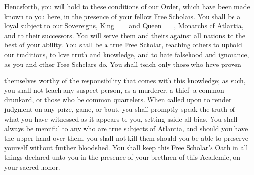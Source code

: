 \documentclass[avery5371,grid]{flashcards}
\begin{document}
\begin{flashcard}{
    \begin{minipage}{\cardinnerwidth}
        \fontsize{10}{10}
        \normalfont
        Henceforth, you will hold to these conditions of our Order, which have been made known to you here, in the presence of your fellow Free Scholars.
        You shall be a loyal subject to our Sovereigns, King \_\_ and Queen \_\_, Monarchs of Atlantia, and to their successors. You will serve them and theirs against all nations to the best of your ability.
        You shall be a true Free Scholar, teaching others to uphold our traditions, to love truth and knowledge, and to hate falsehood and ignorance, as you and other Free Scholars do.
        You shall teach only those who have proven
    \end{minipage}
}
    themselves worthy of the responsibility that comes with
    this knowledge;
    as such, you shall not teach any suspect person, as a murderer, a thief, a common drunkard, or those who be common quarrelers.
    When called upon to render judgment on any prize, game, or bout, you shall promptly speak the truth of what you have witnessed as it appears to you, setting aside all bias.
    You shall always be merciful to any who are true subjects of Atlantia, and should you have the upper hand over them, you shall not kill them should you be able to preserve yourself without further bloodshed.
    You shall keep this Free Scholar's Oath in all things declared unto you in the presence of your brethren of this Academie, on your sacred honor.
\end{flashcard}
\end{document}
